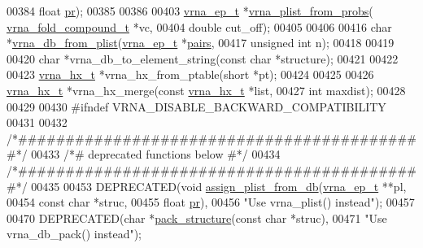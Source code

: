 \begin{DoxyCode}
00384                       \textcolor{keywordtype}{float}       \hyperlink{fold__vars_8h_ac98ec419070aee6831b44e5c700f090f}{pr});
00385 
00386 
00403 \hyperlink{group__struct__utils_structvrna__elem__prob__s}{vrna\_ep\_t} *\hyperlink{group__pf__fold_ga94f6efc0b8d8712b023452794a0a5bd2}{vrna\_plist\_from\_probs}(
      \hyperlink{group__fold__compound_structvrna__fc__s}{vrna\_fold\_compound\_t} *vc,
00404                                  \textcolor{keywordtype}{double}               cut\_off);
00405 
00406 
00416 \textcolor{keywordtype}{char} *\hyperlink{group__struct__utils_ga6a51a36b9245d0bac868c5cd172b9611}{vrna\_db\_from\_plist}(\hyperlink{group__struct__utils_structvrna__elem__prob__s}{vrna\_ep\_t}    *\hyperlink{group__struct__utils_ga6341cbb704924824e0236c1dce791032}{pairs},
00417                          \textcolor{keywordtype}{unsigned} \textcolor{keywordtype}{int} n);
00418 
00419 
00420 \textcolor{keywordtype}{char} *vrna\_db\_to\_element\_string(\textcolor{keyword}{const} \textcolor{keywordtype}{char} *structure);
00421 
00422 
00423 \hyperlink{group__struct__utils_structvrna__hx__s}{vrna\_hx\_t} *vrna\_hx\_from\_ptable(\textcolor{keywordtype}{short} *pt);
00424 
00425 
00426 \hyperlink{group__struct__utils_structvrna__hx__s}{vrna\_hx\_t} *vrna\_hx\_merge(\textcolor{keyword}{const} \hyperlink{group__struct__utils_structvrna__hx__s}{vrna\_hx\_t}  *list,
00427                          \textcolor{keywordtype}{int}              maxdist);
00428 
00429 
00430 \textcolor{preprocessor}{#ifndef VRNA\_DISABLE\_BACKWARD\_COMPATIBILITY}
00431 
00432 \textcolor{comment}{/*###########################################*/}
00433 \textcolor{comment}{/*# deprecated functions below              #*/}
00434 \textcolor{comment}{/*###########################################*/}
00435 
00453 DEPRECATED(\textcolor{keywordtype}{void} \hyperlink{group__struct__utils_gab61df77cf7949cd516181fce0c3d7d78}{assign\_plist\_from\_db}(\hyperlink{group__struct__utils_structvrna__elem__prob__s}{vrna\_ep\_t}  **pl,
00454                                      \textcolor{keyword}{const} \textcolor{keywordtype}{char} *struc,
00455                                      \textcolor{keywordtype}{float}      \hyperlink{fold__vars_8h_ac98ec419070aee6831b44e5c700f090f}{pr}),
00456 \textcolor{stringliteral}{"Use vrna\_plist() instead"});
00457 
00470 DEPRECATED(\textcolor{keywordtype}{char} *\hyperlink{group__struct__utils_gac6dfa5e22928c087c6e09ff0054a7ced}{pack\_structure}(\textcolor{keyword}{const} \textcolor{keywordtype}{char} *struc),
00471 \textcolor{stringliteral}{"Use vrna\_db\_pack() instead"});

\end{DoxyCode}
